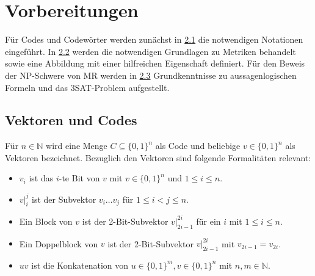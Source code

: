 \documentclass[11pt]{article}
\theoremstyle{break}
\theoremstyle{norm}
\begin{document}
\section{Vorbereitungen}\label{absch2}
Für Codes und Codewörter werden zunächst in \hyperref[vektorenundcodes]{2.1} die notwendigen Notationen eingeführt. In \hyperref[metrik]{2.2} werden die notwendigen Grundlagen zu Metriken behandelt sowie eine Abbildung mit einer hilfreichen Eigenschaft definiert. Für den Beweis der NP-Schwere von MR werden in \hyperref[sat]{2.3} Grundkenntnisse zu aussagenlogischen Formeln und das 3SAT-Problem aufgestellt.
\subsection{Vektoren und Codes}
\label{vektorenundcodes}
Für $n\in\mathbb{N}$ wird eine Menge $C \subseteq \{0,1\}^n$ als Code und beliebige $v \in \{0,1\}^n$ als Vektoren bezeichnet. Bezuglich den Vektoren sind folgende Formalitäten relevant:
\begin{itemize}
    \item $v_i$ ist das $i$-te Bit von $v$ mit $v\in\{0,1\}^n$ und $1\leq i \leq n$.
    \item $v|_i^j$  ist der Subvektor $v_i\ldots v_j$ für $1 \leq i < j \leq n$.
    \item Ein Block von $v$ ist der 2-Bit-Subvektor $v|_{2i-1}^{2i}$ für ein $i$ mit $1\leq i \leq n$.
    \item Ein Doppelblock von $v$ ist der 2-Bit-Subvektor $v|_{2i-1}^{2i}$ mit $v_{2i-1}=v_{2i}$.
    \item $uv$ ist die Konkatenation von $u\in\{0,1\}^m, v\in\{0,1\}^n$ mit $n, m \in \mathbb{N}$.
    \end{itemize}   
\end{document}
